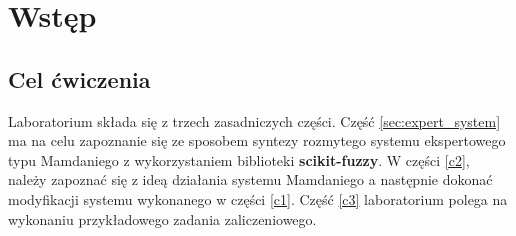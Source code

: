 \section{Wstęp}\label{sec:wstep}
\subsection{Cel ćwiczenia}\label{subsec:cel}

Laboratorium składa się z trzech zasadniczych części. Część \ref{sec:expert_system} ma na celu zapoznanie się ze sposobem syntezy rozmytego systemu ekspertowego typu Mamdaniego z wykorzystaniem biblioteki \textbf{scikit-fuzzy}. W części \ref{c2}, należy zapoznać się z ideą działania systemu Mamdaniego a następnie dokonać modyfikacji systemu wykonanego w części \ref{c1}. Część \ref{c3} laboratorium polega na wykonaniu przykładowego zadania zaliczeniowego.

